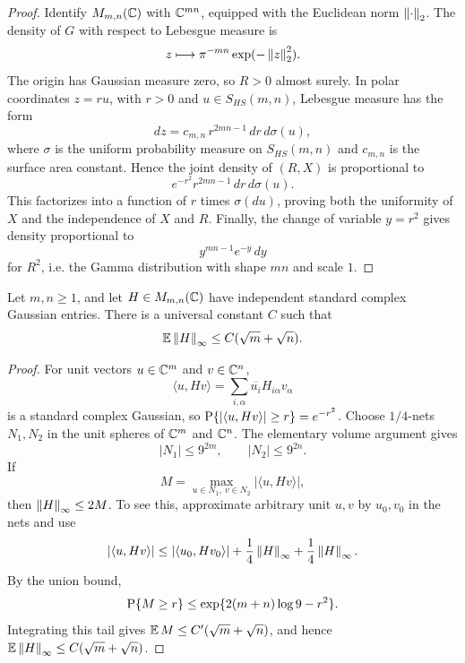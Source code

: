 \begin{proof}
Identify \(M_{m,n}(\mathbb{C})\) with \(\mathbb{C}^{mn}\), equipped with the Euclidean norm
\(\left\lVert\cdot\right\rVert_2\).  The density of \(G\) with respect to Lebesgue measure is
\[
  z\longmapsto \pi^{-mn}\exp(-\left\lVert z\right\rVert_2^2).
\]
The origin has Gaussian measure zero, so \(R>0\) almost surely.  In polar
coordinates \(z=ru\), with \(r>0\) and \(u\in S_{HS}(m,n)\), Lebesgue measure
has the form
\[
  dz=c_{m,n}\, r^{2mn-1}\,dr\,d\sigma(u),
\]
where \(\sigma\) is the uniform probability measure on \(S_{HS}(m,n)\) and
\(c_{m,n}\) is the surface area constant.  Hence the joint density of
\((R,X)\) is proportional to
\[
  e^{-r^2}r^{2mn-1}\,dr\,d\sigma(u).
\]
This factorizes into a function of \(r\) times \(\sigma(du)\), proving both
the uniformity of \(X\) and the independence of \(X\) and \(R\).  Finally,
the change of variable \(y=r^2\) gives density proportional to
\[
  y^{mn-1}e^{-y}\,dy
\]
for \(R^2\), i.e. the Gamma distribution with shape \(mn\) and scale \(1\).
\end{proof}

\begin{lemma}
\label{lem:appendixB-gaussian-op}
Let \(m,n\ge1\), and let \(H\in M_{m,n}(\mathbb{C})\) have independent standard
complex Gaussian entries.  There is a universal constant \(C\) such that
\[
  \operatorname{\mathbb{E}}\left\lVert H\right\rVert_\infty\le C(\sqrt m+\sqrt n).
\]
\end{lemma}

\begin{proof}
For unit vectors \(u\in\mathbb{C}^m\) and \(v\in\mathbb{C}^n\),
\[
  \langle u,Hv\rangle
  =
  \sum_{i,\alpha}\overline{u_i}H_{i\alpha}v_\alpha
\]
is a standard complex Gaussian, so
\(\operatorname{P}\{|\langle u,Hv\rangle|\ge r\}=e^{-r^2}\).
Choose \(1/4\)-nets \(N_1,N_2\) in the unit spheres of \(\mathbb{C}^m\) and
\(\mathbb{C}^n\).  The elementary volume argument gives
\[
  |N_1|\le9^{2m},\qquad |N_2|\le9^{2n}.
\]
If
\[
  M=\max_{u\in N_1,\ v\in N_2}|\langle u,Hv\rangle|,
\]
then \(\left\lVert H\right\rVert_\infty\le2M\).  To see this, approximate arbitrary unit
\(u,v\) by \(u_0,v_0\) in the nets and use
\[
  |\langle u,Hv\rangle|
  \le
  |\langle u_0,Hv_0\rangle|
  +\frac14\left\lVert H\right\rVert_\infty+\frac14\left\lVert H\right\rVert_\infty .
\]
By the union bound,
\[
  \operatorname{P}\{M\ge r\}\le
  \exp\{2(m+n)\log9-r^2\}.
\]
Integrating this tail gives
\(\operatorname{\mathbb{E}} M\le C'(\sqrt m+\sqrt n)\), and hence
\(\operatorname{\mathbb{E}}\left\lVert H\right\rVert_\infty\le C(\sqrt m+\sqrt n)\).
\end{proof}

